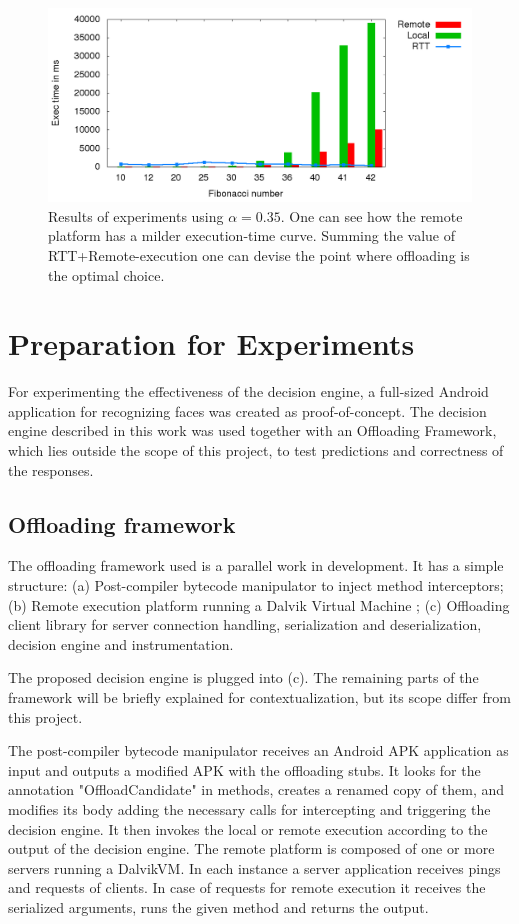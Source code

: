 \documentclass[10pt, conference, letterpaper]{IEEEtran}
\begin{document}
\begin{figure}[!t]
  \centering
  \includegraphics[width=1\textwidth]{plots/executions/executions.png}
  \caption{Results of experiments using $\alpha = 0.35$. One can see how the remote platform has a milder execution-time curve. Summing the value of RTT+Remote-execution one can devise the point where offloading is the optimal choice.}
  \label{fig:exectime}
\end{figure}

  \section{Preparation for Experiments}
  For experimenting the effectiveness of the decision engine, a full-sized Android application for recognizing faces was created as proof-of-concept. The decision engine described in this work was used together with an Offloading Framework, which lies outside the scope of this project, to test predictions and correctness of the responses.

  \subsection{Offloading framework}
  The offloading framework used is a parallel work in development. It has a simple structure: (a) Post-compiler bytecode manipulator to inject method interceptors; (b) Remote execution platform running a Dalvik Virtual Machine \cite{ehringer2010dalvik}; (c) Offloading client library for server connection handling, serialization and deserialization, decision engine and instrumentation.

  The proposed decision engine is plugged into (c). The remaining parts of the framework will be briefly explained for contextualization, but its scope differ from this project.

  The post-compiler bytecode manipulator receives an Android APK application as input and outputs a modified APK with the offloading stubs. It looks for the annotation "OffloadCandidate" in methods, creates a renamed copy of them, and modifies its body adding the necessary calls for intercepting and triggering the decision engine. It then invokes the local or remote execution according to the output of the decision engine. The remote platform is composed of one or more servers running a DalvikVM. In each instance a server application receives pings and requests of clients. In case of requests for remote execution it receives the serialized arguments, runs the given method and returns the output.
\end{document}
